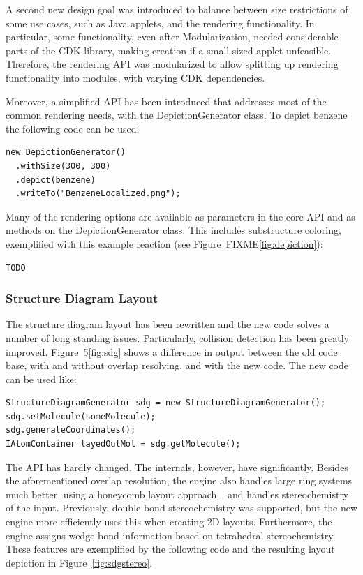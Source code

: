 \documentclass[10pt]{bmcart}
\begin{document}
  A second new design goal was introduced to balance between size restrictions
  of some use cases, such as Java applets, and the rendering functionality. In
  particular, some functionality, even after Modularization, needed considerable
  parts of the CDK library, making creation if a small-sized applet unfeasible.
  Therefore, the rendering API was modularized to allow splitting up rendering
  functionality into modules, with varying CDK dependencies.
  
  
  Moreover, a simplified API has been introduced that addresses most of the
  common rendering needs, with the DepictionGenerator class. To depict benzene
  the following code can be used:

\begin{verbatim}
new DepictionGenerator()
  .withSize(300, 300)
  .depict(benzene)
  .writeTo("BenzeneLocalized.png");
\end{verbatim}

  Many of the rendering options are available as parameters in the core API
  and as methods on the DepictionGenerator class. This includes substructure
  coloring, exemplified with this example reaction (see Figure~FIXME\ref{fig:depiction}):

\begin{verbatim}
TODO
\end{verbatim}

  \subsubsection*{Structure Diagram Layout}

  The structure diagram layout has been rewritten and the new code solves a
  number of long standing issues. Particularly, collision detection has been
  greatly improved. Figure~5\ref{fig:sdg} shows a difference in output between
  the old code base, with and without overlap resolving, and with the new code.
  The new code can be used like:

\begin{verbatim}
StructureDiagramGenerator sdg = new StructureDiagramGenerator();
sdg.setMolecule(someMolecule);
sdg.generateCoordinates();
IAtomContainer layedOutMol = sdg.getMolecule();
\end{verbatim}

The API has hardly changed. The internals, however, have significantly. Besides
the aforementioned overlap resolution, the engine also handles large ring
systems much better, using a honeycomb layout approach~\cite{FIXME}, %
and handles stereochemistry of the input. Previously, double bond stereochemistry
was supported, but the new engine more efficiently uses this when creating 2D
layouts. Furthermore, the engine assigns wedge bond information based on
tetrahedral stereochemistry. These features are exemplified by the following
code and the resulting layout depiction in Figure~\ref{fig:sdgstereo}.
\end{document}

